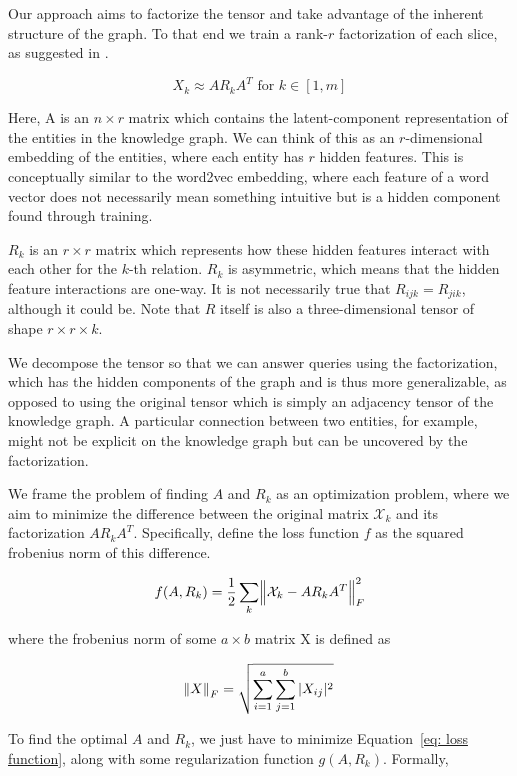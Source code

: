 \documentclass[pageno]{final_paper}
\begin{document}
Our approach aims to factorize the tensor and take advantage of the inherent
structure of the graph. To that end we train a rank-$r$ factorization of each
slice, as suggested in \cite{Bader2007, Nickel2011}.

$$X_k \approx A R_k A^T \text{ for } k \in [1,m]$$

Here, A is an $n\times r$ matrix which contains the latent-component
representation of the entities in the knowledge graph. We can think of this as
an $r$-dimensional embedding of the entities, where each entity has $r$ hidden
features. This is conceptually similar to the word2vec embedding, where each
feature of a word vector does not necessarily mean something intuitive but is a
hidden component found through training.

$R_k$ is an $r\times r$ matrix which represents how these hidden features
interact with each other for the $k$-th relation. $R_k$ is asymmetric, which
means that the hidden feature interactions are one-way. It is not necessarily
true that $R_{ijk} = R_{jik}$, although it could be. Note that $R$ itself is
also a three-dimensional tensor of shape $r\times r\times k$.

We decompose the tensor so that we can answer queries using the factorization,
which has the hidden components of the graph and is thus more generalizable, as
opposed to using the original tensor which is simply an adjacency tensor of the
knowledge graph. A particular connection between two entities, for example,
might not be explicit on the knowledge graph but can be uncovered by the
factorization.

We frame the problem of finding $A$ and $R_k$ as an optimization problem, where
we aim to minimize the difference between the original matrix $\mathcal{X}_k$
and its factorization $AR_kA^T$. Specifically, define the loss function $f$ as
the squared frobenius norm of this difference.

\begin{equation}
\label{eq: loss function}
    f(A, R_k) = \dfrac{1}{2} \sum_k \norm{\mathcal{X}_k - AR_kA^T}_F^2
\end{equation}

where the frobenius norm of some $a\times b$ matrix X is defined as

$$\norm{X}_F = \sqrt{\sum_{i=1}^a \sum_{j=1}^b |X_{ij}|^2}$$

To find the optimal $A$ and $R_k$, we just have to minimize Equation~\eqref{eq: loss
function}, along with some regularization function $g(A, R_k)$. Formally,
\end{document}
